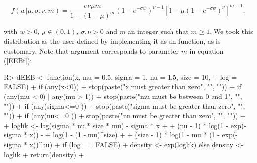 \documentclass[nojss]{jss}
\begin{document}
\begin{equation} \label{EEBf}
  f(w|\mu, \sigma, \nu, m) = \frac{\sigma\nu\mu m}{1-(1-\mu)^m} \left(1 - e^{-\sigma w} \right)^{\nu-1} \left[ 1 - \mu\left(1 - e^{-\sigma w} \right)^\nu \right]^{m-1},
\end{equation}

with $w>0$, $\mu \in (0,1)$, $\sigma, \nu>0$ and $m$ an integer such that $m \geq 1$. We took this distribution as the user-defined by implementing it as an  function, as is customary. Note that argument  corresponds to parameter $m$ in equation (\ref{EEBf}):

\begin{Schunk}
\begin{Sinput}
R> dEEB <- function(x, mu = 0.5, sigma = 1, nu = 1.5, size = 10,
+                   log = FALSE){
+    if (any(x<0))
+      stop(paste("x must greater than zero", "\n", ""))
+    if (any(mu < 0) | any(mu > 1))
+      stop(paste("mu must be between 0 and 1", "\n", ""))
+    if (any(sigma<=0 ))
+      stop(paste("sigma must be greater than zero", "\n", ""))
+    if (any(nu<=0 ))
+      stop(paste("nu must be greater than zero", "\n", ""))
+  
+    loglik <- log(sigma * nu * size *  mu) - sigma * x +
+              (nu - 1) * log(1 - exp(-sigma * x)) -
+              log(1 - (1 - mu)^size) +
+              (size - 1) * log(1 - mu * (1 - exp(-sigma * x))^nu)
+    if (log == FALSE)
+      density <- exp(loglik) else density <- loglik
+    return(density)
+  }
\end{Sinput}
\end{Schunk}
\end{document}
